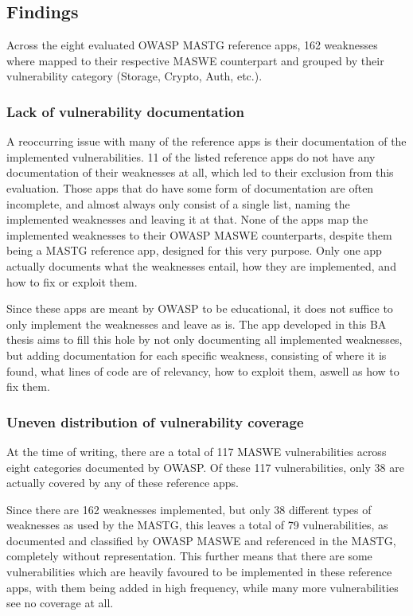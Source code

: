 \subsection{Findings}
Across the eight evaluated OWASP MASTG reference apps, 162 weaknesses where mapped to their respective MASWE counterpart and grouped by their vulnerability category (Storage, Crypto, Auth, etc.).

\subsubsection{Lack of vulnerability documentation}
A reoccurring issue with many of the reference apps is their documentation of the implemented vulnerabilities. 11 of the listed reference apps do not have any documentation of their weaknesses at all, which led to their exclusion from this evaluation. Those apps that do have some form of documentation are often incomplete, and almost always only consist of a single list, naming the implemented weaknesses and leaving it at that. None of the apps map the implemented weaknesses to their OWASP MASWE counterparts, despite them being a MASTG reference app, designed for this very purpose. Only one app  actually documents what the weaknesses entail, how they are implemented, and how to fix or exploit them. 

Since these apps are meant by OWASP to be educational, it does not suffice to only implement the weaknesses and leave as is. The app developed in this BA thesis aims to fill this hole by not only documenting all implemented weaknesses, but adding documentation for each specific weakness, consisting of where it is found, what lines of code are of relevancy, how to exploit them, aswell as how to fix them.

\subsubsection{Uneven distribution of vulnerability coverage}
At the time of writing, there are a total of 117 MASWE vulnerabilities across eight categories documented by OWASP. Of these 117 vulnerabilities, only 38 are actually covered by any of these reference apps. 


Since there are 162 weaknesses implemented, but only 38 different types of weaknesses as used by the MASTG, this leaves a total of 79 vulnerabilities, as documented and classified by OWASP MASWE and referenced in the MASTG, completely without representation. This further means that there are some vulnerabilities which are heavily favoured to be implemented in these reference apps, with them being added in high frequency, while many more vulnerabilities see no coverage at all.

